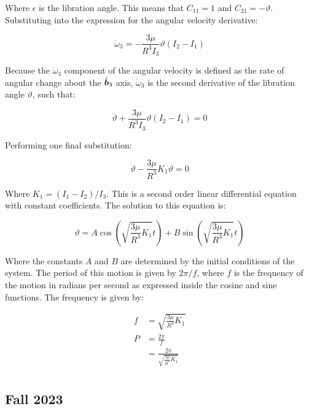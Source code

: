 Where $\epsilon$ is the libration angle. This means that $C_{11} = 1$ and $C_{21} = -\vartheta$. Substituting into the expression for the angular velocity derivative:

\begin{equation}
    \dot{\omega}_3 = -\frac{3 \mu}{R^3 I_3} \vartheta \left(I_2 - I_1\right)
\end{equation}

Because the $\dot{\omega}_3$ component of the angular velocity is defined as the rate of angular change about the $\hat{\boldsymbol{b}}_3$ axis, $\dot{\omega}_3$ is the second derivative of the libration angle $\vartheta$, such that:

\begin{equation}
    \ddot{\vartheta} + \frac{3 \mu}{R^3 I_3} \vartheta \left(I_2 - I_1\right) = 0
\end{equation}

Performing one final substitution:

\begin{equation}
    \ddot{\vartheta} - \frac{3 \mu}{R^3} K_1 \vartheta = 0
\end{equation}

Where $K_1 = (I_1 - I_2) / I_3$. This is a second order linear differential equation with constant coefficients. The solution to this equation is:

\begin{equation}
    \vartheta = A \cos\left(\sqrt{\frac{3 \mu}{R^3} K_1} t\right) + B \sin\left(\sqrt{\frac{3 \mu}{R^3} K_1} t\right)
\end{equation}

Where the constants $A$ and $B$ are determined by the initial conditions of the system. The period of this motion is given by $2\pi / f$, where $f$ is the frequency of the motion in radians per second as expressed inside the cosine and sine functions. The frequency is given by:

\begin{align*}
    f &= \sqrt{\frac{3 \mu}{R^3} K_1} \\
    P &= \frac{2\pi}{f} \\
    &= \frac{2\pi}{\sqrt{\frac{3 \mu}{R^3} K_1}} \\
\end{align*}


\subsection{Fall 2023}

